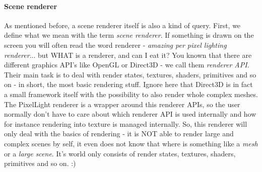 \paragraph{Scene renderer}
As mentioned before, a scene renderer itself is also a kind of query. First, we define what we mean with the term \emph{scene renderer}. If something is drawn on the screen you will often read the word renderer - \emph{amazing per pixel lighting renderer}... but WHAT is a renderer, and can I eat it? You known that there are different graphics API's like OpenGL or Direct3D - we call them \emph{renderer API}. Their main task is to deal with render states, textures, shaders, primitives and so on - in short, the most basic rendering stuff. Ignore here that Direct3D is in fact a small framework itself with the possibility to also render whole complex meshes. The PixelLight renderer is a wrapper around this renderer APIs, so the user normally don't have to care about which renderer API is used internally and how for instance rendering into texture is managed internally. So, this renderer will only deal with the basics of rendering - it is NOT able to render large and complex scenes by self, it even does not know that where is something like a \emph{mesh} or a \emph{large scene}. It's world only consists of render states, textures, shaders, primitives and so on. :)

